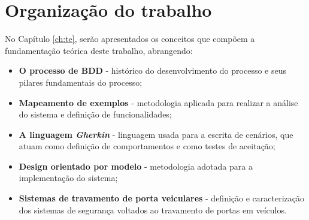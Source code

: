 



\section{\textbf{Organização do trabalho}}
No Capítulo \ref{ch:te}, serão apresentados os conceitos que compõem a fundamentação teórica deste trabalho, abrangendo:

\begin{itemize}
    \item \textbf{O processo de BDD} - histórico do desenvolvimento do processo e seus pilares fundamentais do processo;
    \item \textbf{Mapeamento de exemplos} - metodologia aplicada para realizar a análise do sistema e definição de funcionalidades;
    \item \textbf{A linguagem \textit{Gherkin}} - linguagem usada para a escrita de cenários, que atuam como definição de comportamentos e como testes de aceitação;
    \item \textbf{Design orientado por modelo} - metodologia adotada para a implementação do sistema;
    \item \textbf{Sistemas de travamento de porta veiculares} - definição e caracterização dos sistemas de segurança voltados ao travamento de portas em veículos. 
\end{itemize}

